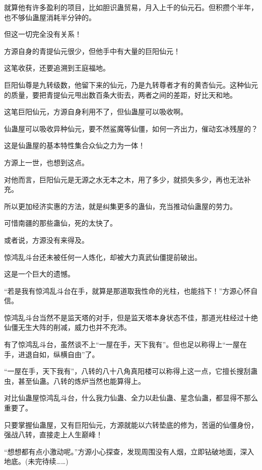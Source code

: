 \begin{this_body}
就算他有许多盈利的项目，比如胆识蛊贸易，月入上千的仙元石。但积攒个半年，也不够仙蛊屋消耗半分钟的。

但这一切完全没有关系！

方源自身的青提仙元很少，但他手中有大量的巨阳仙元！

这笔收获，还要追溯到王庭福地。

巨阳仙尊是九转级数，他留下来的仙元，乃是九转尊者才有的黄杏仙元。这种仙元的质量，要把青提仙元甩出数百条大街去，两者之间的差距，好比天和地。

这笔巨阳仙元，方源自身利用不了，但仙蛊屋可以吸收啊。

仙蛊屋可以吸收异种仙元，要不然鲨魔等仙僵，如何一齐出力，催动玄冰残屋的？

这是仙蛊屋的基本特性集合众仙之力为一体！

方源上一世，也想到这点。

对他而言，巨阳仙元是无源之水无本之木，用了多少，就损失多少，再也无法补充。

所以更加经济实惠的方法，就是纠集更多的蛊仙，充当推动仙蛊屋的劳力。

可惜南疆的那些蛊仙，死的太快了。

或者说，方源没有来得及。

惊鸿乱斗台还未被任何一人炼化，却被大力真武仙僵提前破出。

这是一个巨大的遗憾。

“若是我有惊鸿乱斗台在手，就算是那道取我性命的光柱，也能挡下！”方源心怀自信。

惊鸿乱斗台当然不是监天塔的对手，但是监天塔本身状态不佳，那道光柱经过十绝仙僵无生大阵的削减，威力也并不充沛。

有了惊鸿乱斗台，虽然谈不上“一屋在手，天下我有”。但也足以称得上“一屋在手，进退自如，纵横自由”了。

“一屋在手，天下我有”，八转的八十八角真阳楼可以称得上这一点，它擅长搜刮蛊虫，甚至仙蛊。八转的炼炉当然也能算得上。

对比仙蛊屋惊鸿乱斗台，什么我力仙蛊、全力以赴仙蛊、星念仙蛊，都显得不那么重要了。

只要掌握仙蛊屋，又有巨阳仙元，方源就能以六转垫底的修为，苦逼的仙僵身份，强战八转，直接走上人生巅峰！

“想想都有点小激动呢。”方源小心探查，发现周围没有人烟，立即钻破地面，深入地底。(未完待续……)

\end{this_body}

